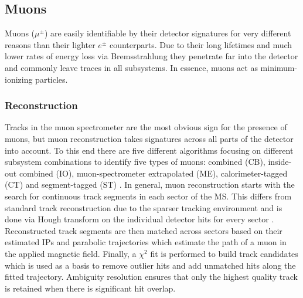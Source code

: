 \subsection{Muons}

Muons ($\mu^{\pm}$) are easily identifiable by their detector signatures for very different reasons than their lighter 
$e^{\pm}$ counterparts. Due to their long lifetimes and much lower rates of energy loss via Bremsstrahlung they penetrate 
far into the detector and commonly leave traces in all subsystems. In essence, muons act as minimum-ionizing particles. \par

\subsubsection*{Reconstruction}

Tracks in the muon spectrometer are the most obvious sign for the presence of muons, but muon reconstruction takes 
signatures across all parts of the detector into account. To this end there are five different algorithms focusing on 
different subsystem combinations to identify five types of muons: combined (CB), inside-out combined (IO), muon-spectrometer 
extrapolated (ME), calorimeter-tagged (CT) and segment-tagged (ST) \cite{atlas-muons}. In general, muon reconstruction starts 
with the search for continuous track segments in each sector of the MS. This differs from standard track reconstruction due 
to the sparser tracking environment and is done via Hough transform on the individual detector hits for every sector 
\cite{illingworth-hough-transform}. Reconstructed track segments are then matched across sectors based on their estimated 
IPs and parabolic trajectories which estimate the path of a muon in the applied magnetic field. Finally, a $\chi^2$ fit is 
performed to build track candidates which is used as a basis to remove outlier hits and add unmatched hits along the fitted 
trajectory. Ambiguity resolution ensures that only the highest quality track is retained when there is significant hit 
overlap. \par

